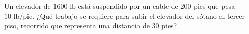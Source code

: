 \item Un elevador de $1600 \text{ lb}$ está suspendido por un cable de $200$ pies que pesa $10 \text{ lb/pie}$. ¿Qué trabajo se requiere para subir el elevador del sótano al tercer piso, recorrido que representa una distancia de $30$ pies?
